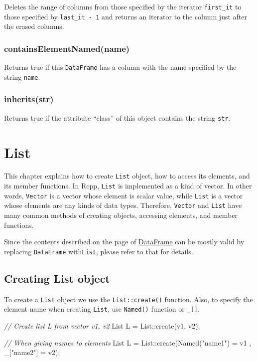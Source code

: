 \documentclass[]{book}
\newenvironment{Shaded}{\begin{snugshade}}{\end{snugshade}}
\newcommand{\StringTok}[1]{\textcolor[rgb]{0.31,0.60,0.02}{#1}}
\newcommand{\CommentTok}[1]{\textcolor[rgb]{0.56,0.35,0.01}{\textit{#1}}}
\newcommand{\NormalTok}[1]{#1}
\theoremstyle{definition}
\theoremstyle{definition}
\theoremstyle{remark}
\begin{document}
Deletes the range of columns from those specified by the iterator
\texttt{first\_it} to those specified by \texttt{last\_it\ -\ 1} and
returns an iterator to the column just after the erased columns.

\subsection{containsElementNamed(name)}\label{containselementnamedname-1}

Returns true if this \texttt{DataFrame} has a column with the name
specified by the string \texttt{name}.

\subsection{inherits(str)}\label{inheritsstr}

Returns true if the attribute ``class'' of this object contains the
string \texttt{str}.

\chapter{List}\label{list}

This chapter explains how to create \texttt{List} object, how to access
its elements, and its member functions. In Rcpp, \texttt{List} is
implemented as a kind of vector. In other words, \texttt{Vector} is a
vector whose element is scalar value, while \texttt{List} is a vector
whose elements are any kinds of data types. Therefore, \texttt{Vector}
and \texttt{List} have many common methods of creating objects,
accessing elements, and member functions.

Since the contents described on the page of
\href{dataframe.md}{DataFrame} can be mostly valid by replacing
\texttt{DataFrame} with\texttt{List}, please refer to that for details.

\section{Creating List object}\label{creating-list-object}

To create a \texttt{List} object we use the \texttt{List::create()}
function. Also, to specify the element name when creating \texttt{List},
use \texttt{Named()} function or \texttt{\_{[}{]}}.

\begin{Shaded}
\begin{Highlighting}[]
\CommentTok{// Create list L from vector v1, v2}
\NormalTok{List L = List::create(v1, v2);}

\CommentTok{// When giving names to elements}
\NormalTok{List L = List::create(Named(}\StringTok{"name1"}\NormalTok{) = v1 , _[}\StringTok{"name2"}\NormalTok{] = v2);}
\end{Highlighting}
\end{Shaded}
\end{document}
